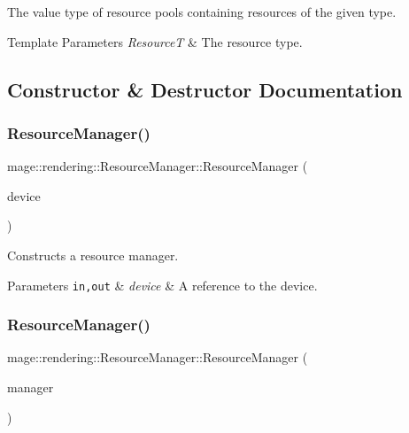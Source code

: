 The value type of resource pools containing resources of the given type.


\begin{DoxyTemplParams}{Template Parameters}
{\em ResourceT} & The resource type. \\
\hline
\end{DoxyTemplParams}


\subsection{Constructor \& Destructor Documentation}
\mbox{\label{classmage_1_1rendering_1_1_resource_manager_a2274df2c0badb1dd2e79642e69c76cb7}} 
\subsubsection{\texorpdfstring{Resource\+Manager()}{ResourceManager()}\hspace{0.1cm}{\footnotesize\ttfamily [1/3]}}
{\footnotesize\ttfamily mage\+::rendering\+::\+Resource\+Manager\+::\+Resource\+Manager (\begin{DoxyParamCaption}\item[{I\+D3\+D11\+Device \&}]{device }\end{DoxyParamCaption})\hspace{0.3cm}{\ttfamily [explicit]}}

Constructs a resource manager.


\begin{DoxyParams}[1]{Parameters}
\mbox{\tt in,out}  & {\em device} & A reference to the device. \\
\hline
\end{DoxyParams}
\mbox{\label{classmage_1_1rendering_1_1_resource_manager_a94b757238211a5b6fe44d773b579ca0a}} 
\subsubsection{\texorpdfstring{Resource\+Manager()}{ResourceManager()}\hspace{0.1cm}{\footnotesize\ttfamily [2/3]}}
{\footnotesize\ttfamily mage\+::rendering\+::\+Resource\+Manager\+::\+Resource\+Manager (\begin{DoxyParamCaption}\item[{const \mbox{\hyperlink{classmage_1_1rendering_1_1_resource_manager}{Resource\+Manager}} \&}]{manager }\end{DoxyParamCaption})\hspace{0.3cm}{\ttfamily [delete]}}

